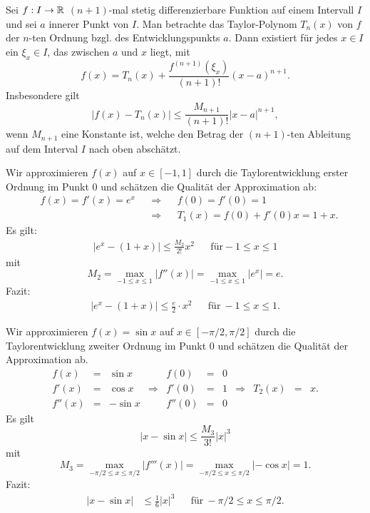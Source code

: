 \begin{thm} 
	Sei $f: I \to \mathbb{R}$ $(n+1)$-mal stetig differenzierbare Funktion auf einem Intervall $I$ und sei $a$ innerer Punkt von $I$. Man betrachte das Taylor-Polynom $T_n(x)$ von $f$ der $n$-ten Ordnung bzgl. des Entwicklungspunkts $a$. Dann existiert für jedes $x \in I$ ein $\xi_x \in I$, das zwischen $a$ und $x$ liegt, mit 
	\[
		f(x)  = T_n(x) + \frac{f^{(n+1)}(\xi_x)}{(n+1)!} (x-a)^{n+1}. 
	\]
	Insbesondere gilt 
	\[
		|f(x) - T_n(x)| \le \frac{M_{n+1}}{(n+1)!} |x-a|^{n+1},
	\]
	wenn $M_{n+1}$ eine Konstante ist, welche den Betrag der $(n+1)$-ten Ableitung auf dem Interval $I$ nach oben abschätzt. 
\end{thm} 

\begin{bsp}
	Wir approximieren $f(x)$ auf $x \in [-1,1]$ durch die Taylorentwicklung erster Ordnung im Punkt $0$ und schätzen die Qualität der Approximation ab: 
	\begin{align*}
		& f(x)  = f'(x) = e^x & & \Longrightarrow & & f(0)  = f'(0) = 1  \\ 
		& & & \Longrightarrow &  & T_1(x) = f(0) + f'(0) x = 1 + x. 
	\end{align*}
	Es gilt: 
	\begin{align*}
		| e^x - (1+x) | \le \frac{M_2}{2!} x^2 & & \text{für} -1 \le x \le 1
	\end{align*}
	mit 
	\[
		M_2 = \max_{-1 \le x \le 1} |f''(x)| = \max_{-1 \le x \le 1} | e^x | = e.
	\]
	Fazit: 
	\begin{align*}
		|e^x - (1+x)| \le \frac{e}{2} \cdot x^2 & & \text{für} \ -1 \le x \le 1.
	\end{align*}
\end{bsp} 

\begin{bsp} 
	Wir approximieren $f(x) = \sin x$ auf $x \in [-\pi/2,\pi/2]$ durch die Taylorentwicklung zweiter Ordnung im Punkt $0$ und schätzen die Qualität der Approximation ab. 
	\[
		\begin{array}{|ccc|c|ccc|cccc}
		f(x) & = & \sin x &  &  f(0) & = & 0 & \\ 
		f'(x)  & = & \cos x & \Longrightarrow & f'(0) & =   & 1 & \Longrightarrow & T_2(x) &  = & x. \\ 
		f''(x)  & =  & - \sin x &  &  f''(0) & = & 0 &
		\end{array} 
	\]
	Es gilt
	\[
		|x - \sin x| \le \frac{M_3}{3!} |x|^3
	\]
	mit 
	\[
		M_3 = \max_{-\pi/2 \le x \le \pi/ 2} | f'''(x) | = \max_{-\pi/2 \le x \le \pi / 2} | - \cos x| = 1.
	\]
	Fazit: 
	\begin{align*}
			|x - \sin x| & \le \frac{1}{6} |x|^3 & & \text{für} \ -\pi/2 \le x \le \pi/2. 
	\end{align*}
\end{bsp} 


